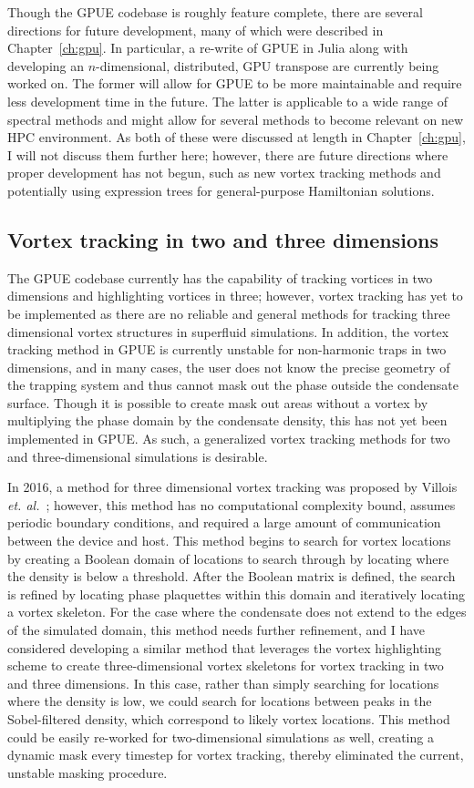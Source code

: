 Though the GPUE codebase is roughly feature complete, there are several directions for future development, many of which were described in Chapter~\ref{ch:gpu}.
In particular, a re-write of GPUE in Julia along with developing an $n$-dimensional, distributed, GPU transpose are currently being worked on.
The former will allow for GPUE to be more maintainable and require less development time in the future.
The latter is applicable to a wide range of spectral methods and might allow for several methods to become relevant on new HPC environment.
As both of these were discussed at length in Chapter~\ref{ch:gpu}, I will not discuss them further here; however,
there are future directions where proper development has not begun, such as new vortex tracking methods and potentially using expression trees for general-purpose Hamiltonian solutions.

\subsection{Vortex tracking in two and three dimensions}

The GPUE codebase currently has the capability of tracking vortices in two dimensions and highlighting vortices in three; however, vortex tracking has yet to be implemented as there are no reliable and general methods for tracking three dimensional vortex structures in superfluid simulations.
In addition, the vortex tracking method in GPUE is currently unstable for non-harmonic traps in two dimensions, and in many cases, the user does not know the precise geometry of the trapping system and thus cannot mask out the phase outside the condensate surface.
Though it is possible to create mask out areas without a vortex by multiplying the phase domain by the condensate density, this has not yet been implemented in GPUE.
As such, a generalized vortex tracking methods for two and three-dimensional simulations is desirable.

In 2016, a method for three dimensional vortex tracking was proposed by Villois \textit{et. al.}~\cite{villois2016}; however, this method has no computational complexity bound, assumes periodic boundary conditions, and required a large amount of communication between the device and host.
This method begins to search for vortex locations by creating a Boolean domain of locations to search through by locating where the density is below a threshold.
After the Boolean matrix is defined, the search is refined by locating phase plaquettes within this domain and iteratively locating a vortex skeleton.
For the case where the condensate does not extend to the edges of the simulated domain, this method needs further refinement, and
I have considered developing a similar method that leverages the vortex highlighting scheme to create three-dimensional vortex skeletons for vortex tracking in two and three dimensions.
In this case, rather than simply searching for locations where the density is low, we could search for locations between peaks in the Sobel-filtered density, which correspond to likely vortex locations.
This method could be easily re-worked for two-dimensional simulations as well, creating a dynamic mask every timestep for vortex tracking, thereby eliminated the current, unstable masking procedure.

